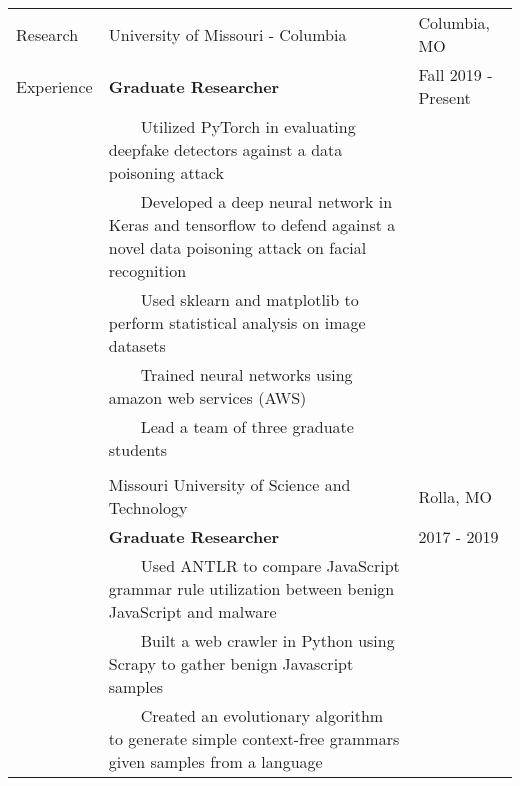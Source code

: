 \documentclass[10.5pt, arial]{article}
\newcommand{\tabitem}{~~\llap{\textbullet}~~}
\begin{document}
\begin{tabular}{p{1.5cm} p{13.2cm} l}
Research    & University of Missouri - Columbia                             & Columbia, MO          \\
Experience  & \textbf{Graduate Researcher}                                  & Fall 2019 - Present   \\ 
            & \tabitem Utilized PyTorch in evaluating deepfake detectors against a data poisoning attack \\
            & \tabitem Developed a deep neural network in Keras and tensorflow to defend against a novel data poisoning attack on facial recognition \\
            & \tabitem Used sklearn and matplotlib to perform statistical analysis on image datasets \\
            & \tabitem Trained neural networks using amazon web services (AWS) &                   \\
            & \tabitem Lead a team of three graduate students  \\
\\
            & Missouri University of Science and Technology                 & Rolla, MO             \\
            & \textbf{Graduate Researcher}                                  & 2017 - 2019           \\
            & \tabitem Used ANTLR to compare JavaScript grammar rule utilization between benign JavaScript and malware \\
            & \tabitem Built a web crawler in Python using Scrapy to gather benign Javascript samples \\
            & \tabitem Created an evolutionary algorithm to generate simple context-free grammars given samples from a language \\
\end{tabular}
\end{document}
